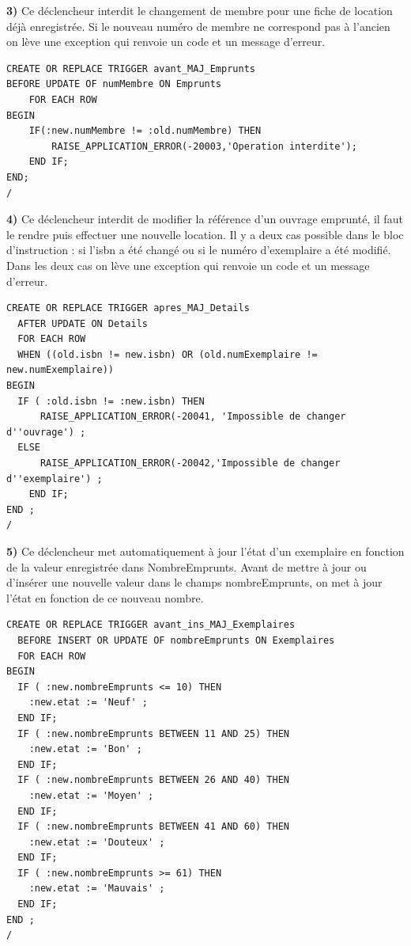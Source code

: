 \documentclass[a4paper,12pt]{article}
\begin{document}
\textbf {3)} Ce déclencheur interdit le changement de membre pour une fiche de location déjà enregistrée. Si le nouveau numéro de membre ne correspond pas à l'ancien on lève une exception qui renvoie un code et un message d'erreur.

\begin{lstlisting}
CREATE OR REPLACE TRIGGER avant_MAJ_Emprunts
BEFORE UPDATE OF numMembre ON Emprunts
	FOR EACH ROW
BEGIN
	IF(:new.numMembre != :old.numMembre) THEN
		RAISE_APPLICATION_ERROR(-20003,'Operation interdite');
	END IF;
END;
/
\end{lstlisting}

\textbf {4)} Ce déclencheur interdit de modifier la référence d’un ouvrage emprunté, il faut le rendre puis effectuer une nouvelle location. Il y a deux cas possible dans le bloc d'instruction : si l'isbn a été changé ou si le numéro d'exemplaire a été modifié. Dans les deux cas on lève une exception qui renvoie un code et un message d'erreur.

\begin{lstlisting}
CREATE OR REPLACE TRIGGER apres_MAJ_Details
  AFTER UPDATE ON Details
  FOR EACH ROW
  WHEN ((old.isbn != new.isbn) OR (old.numExemplaire != new.numExemplaire))
BEGIN
  IF ( :old.isbn != :new.isbn) THEN
      RAISE_APPLICATION_ERROR(-20041, 'Impossible de changer d''ouvrage') ;
  ELSE
      RAISE_APPLICATION_ERROR(-20042,'Impossible de changer d''exemplaire') ;
    END IF;
END ;
/
\end{lstlisting}

\textbf {5)} Ce déclencheur met automatiquement à jour l’état d’un exemplaire en fonction de la valeur enregistrée dans NombreEmprunts. Avant de mettre à jour ou d’insérer une nouvelle valeur dans le champs nombreEmprunts, on met à jour l'état en fonction de ce nouveau nombre. 

\begin{lstlisting}
CREATE OR REPLACE TRIGGER avant_ins_MAJ_Exemplaires
  BEFORE INSERT OR UPDATE OF nombreEmprunts ON Exemplaires
  FOR EACH ROW
BEGIN
  IF ( :new.nombreEmprunts <= 10) THEN
    :new.etat := 'Neuf' ;
  END IF;
  IF ( :new.nombreEmprunts BETWEEN 11 AND 25) THEN
    :new.etat := 'Bon' ;
  END IF;
  IF ( :new.nombreEmprunts BETWEEN 26 AND 40) THEN
    :new.etat := 'Moyen' ;
  END IF;
  IF ( :new.nombreEmprunts BETWEEN 41 AND 60) THEN
    :new.etat := 'Douteux' ;
  END IF;
  IF ( :new.nombreEmprunts >= 61) THEN
    :new.etat := 'Mauvais' ;
  END IF;
END ;
/
\end{lstlisting}
\end{document}

